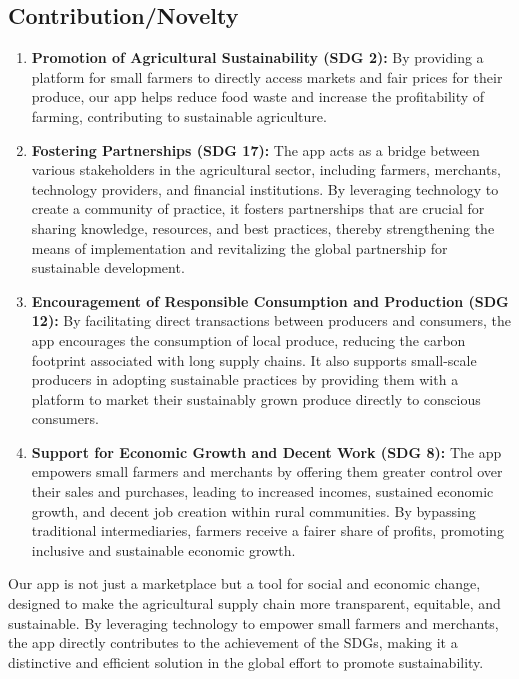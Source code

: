 \documentclass{article}
\begin{document}
\subsection{Contribution/Novelty}
\begin{enumerate}
    \item \textbf{Promotion of Agricultural Sustainability (SDG 2):} By providing a platform for small farmers to directly access markets and fair prices for their produce, our app helps reduce food waste and increase the profitability of farming, contributing to sustainable agriculture.
    
    \item \textbf{Fostering Partnerships (SDG 17):} The app acts as a bridge between various stakeholders in the agricultural sector, including farmers, merchants, technology providers, and financial institutions. By leveraging technology to create a community of practice, it fosters partnerships that are crucial for sharing knowledge, resources, and best practices, thereby strengthening the means of implementation and revitalizing the global partnership for sustainable development.
    
    \item \textbf{Encouragement of Responsible Consumption and Production (SDG 12):} By facilitating direct transactions between producers and consumers, the app encourages the consumption of local produce, reducing the carbon footprint associated with long supply chains. It also supports small-scale producers in adopting sustainable practices by providing them with a platform to market their sustainably grown produce directly to conscious consumers.
    
    \item \textbf{Support for Economic Growth and Decent Work (SDG 8):} The app empowers small farmers and merchants by offering them greater control over their sales and purchases, leading to increased incomes, sustained economic growth, and decent job creation within rural communities. By bypassing traditional intermediaries, farmers receive a fairer share of profits, promoting inclusive and sustainable economic growth.
\end{enumerate}

Our app is not just a marketplace but a tool for social and economic change, designed to make the agricultural supply chain more transparent, equitable, and sustainable. By leveraging technology to empower small farmers and merchants, the app directly contributes to the achievement of the SDGs, making it a distinctive and efficient solution in the global effort to promote sustainability.
\end{document}
